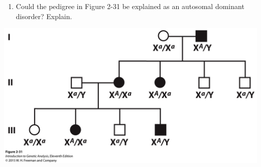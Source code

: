 \documentclass[11pt,]{article}
\providecommand{\tightlist}{%
  \setlength{\itemsep}{0pt}\setlength{\parskip}{0pt}}
\begin{document}
\begin{blackbox}

\begin{enumerate}
\def\labelenumi{\arabic{enumi}.}
\setcounter{enumi}{12}
\tightlist
\item
  Could the pedigree in Figure 2-31 be explained as an autosomal
  dominant disorder? Explain.
\end{enumerate}

\hfill\break

\begin{center}\includegraphics[width=0.55\linewidth,]{input/figure_02_31} \end{center}

\vspace{14cm}

\end{blackbox}
\end{document}
